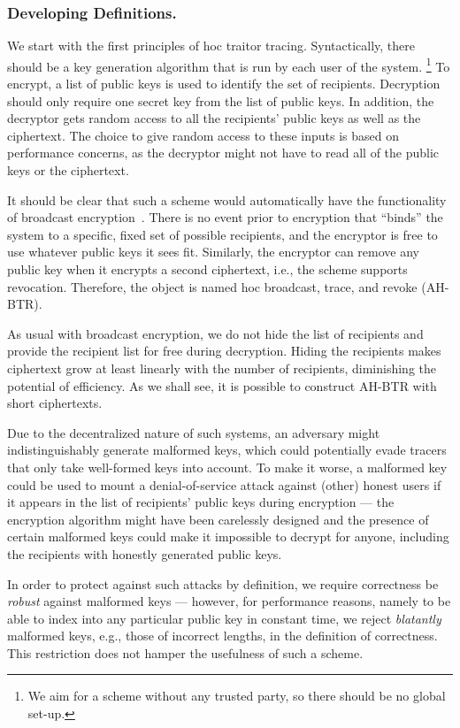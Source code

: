 \subsubsection{Developing Definitions.}
We start with the first principles of \ad hoc traitor tracing.
Syntactically, there should be a key generation algorithm that is run by each user of the system.%
\footnote{We aim for a scheme without any trusted party, so there should be no global set-up.}
To encrypt, a list of public keys is used to identify the set of recipients.
Decryption should only require one secret key from the list of public keys.
In addition, the decryptor gets random access to all the recipients' public keys as well as the ciphertext.
The choice to give random access to these inputs is based on performance concerns, as the decryptor might not have to read all of the public keys or the ciphertext.

It should be clear that such a scheme would automatically have the functionality of broadcast encryption~\cite{C:FiaNao93}.
There is no event prior to encryption that ``binds'' the system to a specific, fixed set of possible recipients, and the encryptor is free to use whatever public keys it sees fit.
Similarly, the encryptor can remove any public key when it encrypts a second ciphertext, i.e., the scheme supports revocation.
Therefore, the object is named \ad hoc broadcast, trace, and revoke (AH-BTR).

As usual with broadcast encryption, we do not hide the list of recipients
and
provide the recipient list for free during decryption.
Hiding the recipients makes ciphertext
grow at least linearly with the number of recipients,
diminishing the potential of efficiency.
As we shall see, it is possible to construct AH-BTR with short ciphertexts.

Due to the decentralized nature of such systems,
an adversary might indistinguishably generate malformed keys,
which could potentially evade tracers that only take well-formed keys into account.
To make it worse, a malformed key could be used to mount a denial-of-service attack against (other) honest users if it appears in the list of recipients' public keys during encryption ---
the encryption algorithm might have been carelessly designed and the presence of certain malformed keys could make it impossible to decrypt for anyone, including the recipients with honestly generated public keys.

In order to protect against such attacks by definition,
we require correctness be \emph{robust} against malformed keys ---
however, for performance reasons, namely to be able to index into any particular public key in constant time,
we reject \emph{blatantly} malformed keys, e.g., those of incorrect lengths, in the definition of correctness.
This restriction does not hamper the usefulness of such a scheme.

